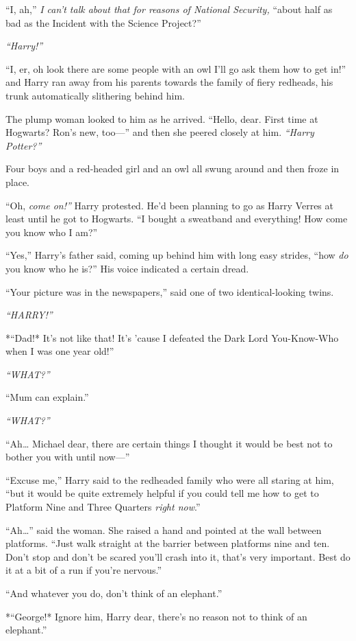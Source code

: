 ``I, ah,'' \emph{I can't talk about that for reasons of National
Security,} ``about half as bad as the Incident with the Science
Project?''

\emph{``Harry!''}

``I, er, oh look there are some people with an owl I'll go ask them how
to get in!'' and Harry ran away from his parents towards the family of
fiery redheads, his trunk automatically slithering behind him.

The plump woman looked to him as he arrived. ``Hello, dear. First time
at Hogwarts? Ron's new, too---'' and then she peered closely at him.
\emph{``Harry Potter?''}

Four boys and a red-headed girl and an owl all swung around and then
froze in place.

``Oh, \emph{come on!''} Harry protested. He'd been planning to go as
Harry Verres at least until he got to Hogwarts. ``I bought a sweatband
and everything! How come you know who I am?''

``Yes,'' Harry's father said, coming up behind him with long easy
strides, ``how \emph{do} you know who he is?'' His voice indicated a
certain dread.

``Your picture was in the newspapers,'' said one of two
identical-looking twins.

\emph{``HARRY!''}

*``Dad!* It's not like that! It's 'cause I defeated the Dark Lord
You-Know-Who when I was one year old!''

\emph{``WHAT?''}

``Mum can explain.''

\emph{``WHAT?''}

``Ah\ldots{} Michael dear, there are certain things I thought it would
be best not to bother you with until now---''

``Excuse me,'' Harry said to the redheaded family who were all staring
at him, ``but it would be quite extremely helpful if you could tell me
how to get to Platform Nine and Three Quarters \emph{right now}.''

``Ah\ldots{}'' said the woman. She raised a hand and pointed at the wall
between platforms. ``Just walk straight at the barrier between platforms
nine and ten. Don't stop and don't be scared you'll crash into it,
that's very important. Best do it at a bit of a run if you're nervous.''

``And whatever you do, don't think of an elephant.''

*``George!* Ignore him, Harry dear, there's no reason not to think of an
elephant.''

